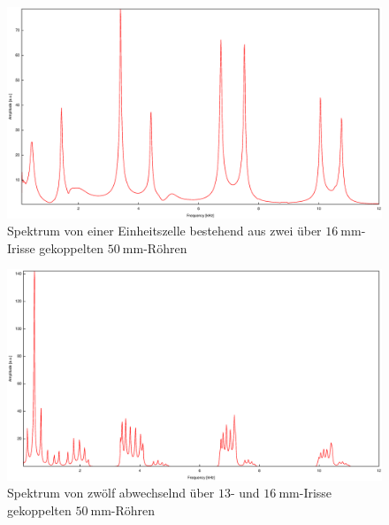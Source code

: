 \begin{figure}
\centering
\includegraphics[width=\linewidth-60pt,height=\textheight-60pt,keepaspectratio]{FP-V23data/4.8_100mm_16mm.eps}
\caption{Spektrum von einer Einheitszelle bestehend aus zwei über $\SI{16}{\milli\meter}$-Irisse gekoppelten $\SI{50}{\milli\meter}$-Röhren}
\label{fig:50_16_50}
\end{figure}
\begin{figure}
\centering
\includegraphics[width=\linewidth-60pt,height=\textheight-60pt,keepaspectratio]{FP-V23data/4.10_600mm_13_16mm.eps}
\caption{Spektrum von zwölf abwechselnd über $13$- und $\SI{16}{\milli\meter}$-Irisse gekoppelten $\SI{50}{\milli\meter}$-Röhren}
\label{fig:12_50_13_16}
\end{figure}


